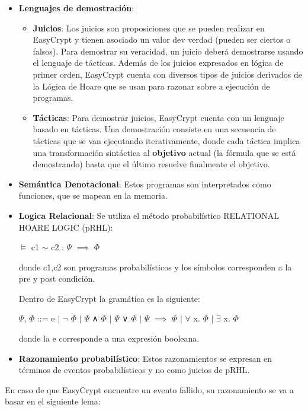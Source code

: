\documentclass[runningheads,a4paper]{llncs}
\begin{document}
\begin{itemize}
	\item \textbf{Lenguajes de demostración}:
\begin{itemize}
		\item \textbf{Juicios}:
Los juicios son proposiciones que se pueden realizar en EasyCrypt y tienen asociado un valor dev verdad (pueden ser ciertos o falsos). Para demostrar su veracidad, un juicio deberá demostrarse usando el lenguaje de tácticas. Además de los juicios expresados en lógica de primer orden, EasyCrypt cuenta con diversos tipos de juicios derivados de la Lógica de Hoare que se usan para razonar sobre a ejecución de programas.  
		\item \textbf{Tácticas}:
Para demostrar juicios, EasyCrypt cuenta con un lenguaje basado en tácticas. Una demostración consiste en una secuencia de tácticas que se van ejecutando iterativamente, donde cada táctica implica una transformación sintáctica al \textbf{objetivo} actual (la fórmula que se está demostrando) hasta que el último resuelve finalmente el objetivo.
\end{itemize}

	\item \textbf{Semántica Denotacional}:
Estos programas son interpretados como funciones, que se mapean en la memoria.

	\item \textbf{Logica Relacional}: Se utiliza el método probabilístico RELATIONAL HOARE LOGIC (pRHL):
		
\centerline{$\models$ c1 $\sim$ c2 : $\Psi$ $\implies$ $\Phi$}	
			
donde c1,c2 son programas probabilísticos y los símbolos corresponden a la pre y post condición.

Dentro de EasyCrypt la gramática es la siguiente:

\centerline{$\Psi$, $\Phi$ ::= e $\mid$ $\neg$ $\Phi$ $\mid$ $\Psi$ ∧ $\Phi$ $\mid$ $\Psi$ ∨ $\Phi$ $\mid$ $\Psi$ $\implies$ $\Phi$ $\mid$ $\forall$ x. $\Phi$ $\mid$ $\exists$ x. $\Phi$}

donde la e corresponde a una expresión booleana.


	\item \textbf{Razonamiento probabilístico}:
Estos razonamientos se expresan en términos de eventos probabilísticos y no como juicios de pRHL.\cite{article3}

\end{itemize}
En caso de que EasyCrypt encuentre un evento fallido, su razonamiento se va a basar en el siguiente lema:
\end{document}
